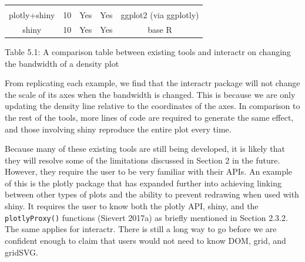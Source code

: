 \documentclass[11pt,]{report}
\begin{document}
\begin{longtable}[]{@{}ccccc@{}}
\begin{minipage}[t]{0.15\columnwidth}
\end{minipage}\tabularnewline
\begin{minipage}[t]{0.18\columnwidth}\centering\strut
plotly+shiny\strut
\end{minipage} & \begin{minipage}[t]{0.18\columnwidth}\centering\strut
10\strut
\end{minipage} & \begin{minipage}[t]{0.18\columnwidth}\centering\strut
Yes\strut
\end{minipage} & \begin{minipage}[t]{0.18\columnwidth}\centering\strut
Yes\strut
\end{minipage} & \begin{minipage}[t]{0.15\columnwidth}\centering\strut
ggplot2 (via ggplotly)\strut
\end{minipage}\tabularnewline
\begin{minipage}[t]{0.18\columnwidth}\centering\strut
shiny\strut
\end{minipage} & \begin{minipage}[t]{0.18\columnwidth}\centering\strut
10\strut
\end{minipage} & \begin{minipage}[t]{0.18\columnwidth}\centering\strut
Yes\strut
\end{minipage} & \begin{minipage}[t]{0.18\columnwidth}\centering\strut
Yes\strut
\end{minipage} & \begin{minipage}[t]{0.15\columnwidth}\centering\strut
base R\strut
\end{minipage}\tabularnewline
\bottomrule
\end{longtable}

Table 5.1: A comparison table between existing tools and
\textsf{interactr} on changing the bandwidth of a density plot

From replicating each example, we find that the \textsf{interactr}
package will not change the scale of its axes when the bandwidth is
changed. This is because we are only updating the density line relative
to the coordinates of the axes. In comparison to the rest of the tools,
more lines of code are required to generate the same effect, and those
involving shiny reproduce the entire plot every time.

Because many of these existing tools are still being developed, it is
likely that they will resolve some of the limitations discussed in
Section 2 in the future. However, they require the user to be very
familiar with their APIs. An example of this is the \textsf{plotly}
package that has expanded further into achieving linking between other
types of plots and the ability to prevent redrawing when used with
\textsf{shiny}. It requires the user to know both the plotly API,
\textsf{shiny}, and the \texttt{plotlyProxy()} functions (Sievert 2017a)
as briefly mentioned in Section 2.3.2. The same applies for
\textsf{interactr}. There is still a long way to go before we are
confident enough to claim that users would not need to know
\textsf{DOM}, grid, and \textsf{gridSVG}.
\end{document}
